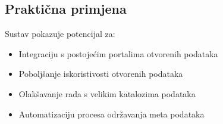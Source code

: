 \subsection{Praktična primjena}
Sustav pokazuje potencijal za:
\begin{itemize}
    \item Integraciju s postojećim portalima otvorenih podataka
    \item Poboljšanje iskoristivosti otvorenih podataka
    \item Olakšavanje rada s velikim katalozima podataka
    \item Automatizaciju procesa održavanja meta podataka
\end{itemize} 